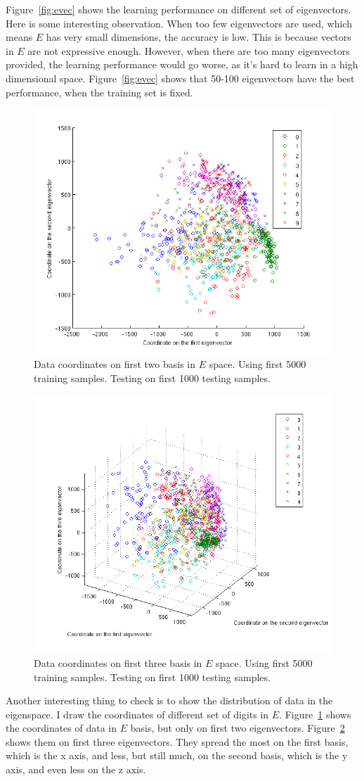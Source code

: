\documentclass[10pt]{article}
\begin{document}
Figure~\ref{fig:evec} shows the learning performance on different set
of eigenvectors. Here is some interesting observation. When too few
eigenvectors are used, which means $E$ has very small dimensions, the
accuracy is low. This is because vectors in $E$ are not expressive
enough. However, when there are too many eigenvectors provided, the
learning performance would go worse, as it's hard to learn in a high
dimensional space.  Figure~\ref{fig:evec} shows that 50-100
eigenvectors have the best performance, when the training set is
fixed.

\begin{figure}
\centering
\includegraphics[width=0.5\columnwidth]{twod_digit.png}
\caption{Data coordinates on first two basis in $E$ space.  Using
first 5000 training samples. Testing on first 1000 testing samples.}
\label{fig:twod}
\end{figure}

\begin{figure}
\centering
\includegraphics[width=0.5\columnwidth]{threed_digit.png}
\caption{Data coordinates on first three basis in $E$ space.  Using
first 5000 training samples. Testing on first 1000 testing samples.}
\label{fig:threed}
\end{figure}

Another interesting thing to check is to show the distribution of data
in the eigenspace. I draw the coordinates of different
set of digits in $E$. Figure~\ref{fig:twod} shows the coordinates of
data in $E$ basis, but only on first two eigenvectors.
Figure~\ref{fig:threed} shows them on first three eigenvectors. They
spread the most on the first basis, which is the x axis, and less, but
still much, on the second basis, which is the y axis, and even less on
the z axis.
\end{document}

